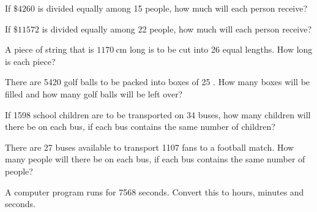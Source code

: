 \begin{exercises}
\begin{questions}
        \Question[2] If \(\$ 4260\) is divided equally among 15 people, how much will each person receive?
            \begin{solutionorbox}[2in]
            \end{solutionorbox}
        \Question[2] If \(\$ 11572\) is divided equally among 22 people, how much will each person receive?
            \begin{solutionorbox}[2in]
            \end{solutionorbox}
        \Question[2] A piece of string that is \(1170 \mathrm{~cm}\) long is to be cut into 26 equal lengths. How long is each piece?
            \begin{solutionorbox}[2in]
            \end{solutionorbox}
        \Question[2] There are 5420 golf balls to be packed into boxes of 25 . How many boxes will be filled and how many golf balls will be left over?
            \begin{solutionorbox}[2in]
            \end{solutionorbox}
        \Question[2] If 1598 school children are to be transported on 34 buses, how many children will there be on each bus, if each bus contains the same number of children?
            \begin{solutionorbox}[2in]
            \end{solutionorbox}
        \Question[2] There are 27 buses available to transport 1107 fans to a football match. How many people will there be on each bus, if each bus contains the same number of people?
            \begin{solutionorbox}[2in]
            \end{solutionorbox}
        \Question[2] A computer program runs for 7568 seconds. Convert this to hours, minutes and seconds.
            \begin{solutionorbox}[2in]
            \end{solutionorbox}
    \end{questions}
\end{exercises}

